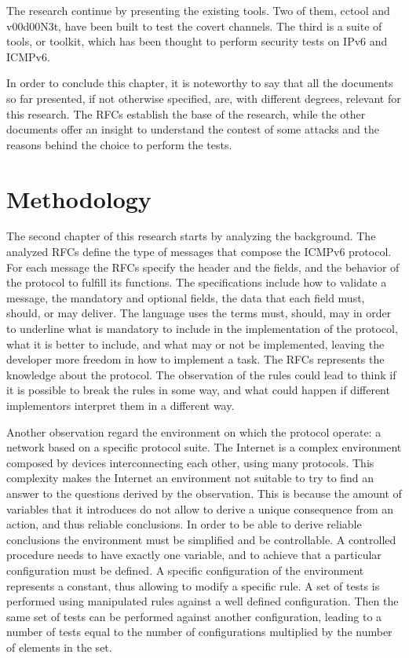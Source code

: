 \documentclass[12pt]{article}
\begin{document}
The research continue by presenting the existing tools. Two of them, cctool and v00d00N3t, have been built to test the covert channels. The third is a suite of tools, or toolkit, which has been thought to perform security tests on IPv6 and ICMPv6.

In order to conclude this chapter, it is noteworthy to say that all the documents so far presented, if not otherwise specified, are, with different degrees, relevant for this research. The RFCs establish the base of the research, while the other documents offer an insight to understand the contest of some attacks and the reasons behind the choice to perform the tests.

\pagebreak

\section{Methodology}
\label{sec:3}

The second chapter of this research starts by analyzing the background. The analyzed RFCs define the type of messages that compose the ICMPv6 protocol. For each message the RFCs specify the header and the fields, and the behavior of the protocol to fulfill its functions. The specifications include how to validate a message, the mandatory and optional fields, the data that each field must, should, or may deliver. The language uses the terms must, should, may in order to underline what is mandatory to include in the implementation of the protocol, what it is better to include, and what may or not be implemented, leaving the developer more freedom in how to implement a task. The RFCs represents the knowledge about the protocol. The observation of the rules could lead to think if it is possible to break the rules in some way, and what could happen if different implementors interpret them in a different way.

Another observation regard the environment on which the protocol operate: a network based on a specific protocol suite. The Internet is a complex environment composed by devices interconnecting each other, using many protocols. This complexity makes the Internet an environment not suitable to try to find an answer to the questions derived by the observation. This is because the amount of variables that it introduces do not allow to derive a unique consequence from an action, and thus reliable conclusions. In order to be able to derive reliable conclusions the environment must be simplified and be controllable. A controlled procedure needs to have exactly one variable, and to achieve that a particular configuration must be defined. A specific configuration of the environment represents a constant, thus allowing to modify a specific rule. A set of tests is performed using manipulated rules against a well defined configuration. Then the same set of tests can be performed against another configuration, leading to a number of tests equal to the number of configurations multiplied by the number of elements in the set.\cite{secExperiments}
\end{document}
